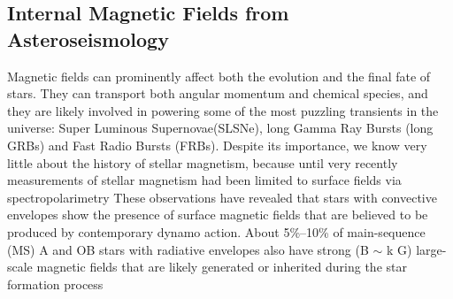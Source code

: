 {\color{red}\subsection{Internal Magnetic Fields from Asteroseismology}}
Magnetic fields can prominently affect both the evolution and the final fate of stars. They can transport both angular momentum and chemical species, and they are likely involved in powering some of the most puzzling transients in the universe: Super Luminous Supernovae(SLSNe), long Gamma Ray Bursts (long GRBs) and Fast Radio Bursts (FRBs). Despite its importance, we know very little about the history of stellar magnetism, because until very recently measurements of stellar magnetism had been limited to surface fields via spectropolarimetry
These observations have revealed that stars with convective envelopes show the presence of surface magnetic fields that are believed to be produced by contemporary dynamo action. About 5\%–10\% of main-sequence (MS) A and OB stars with radiative envelopes also have strong (B $\sim$ k G) large-scale magnetic fields that are likely generated or inherited during the star formation process  \citep[fossil fields, see e.g.,][]{2012ASPC..464..405W}